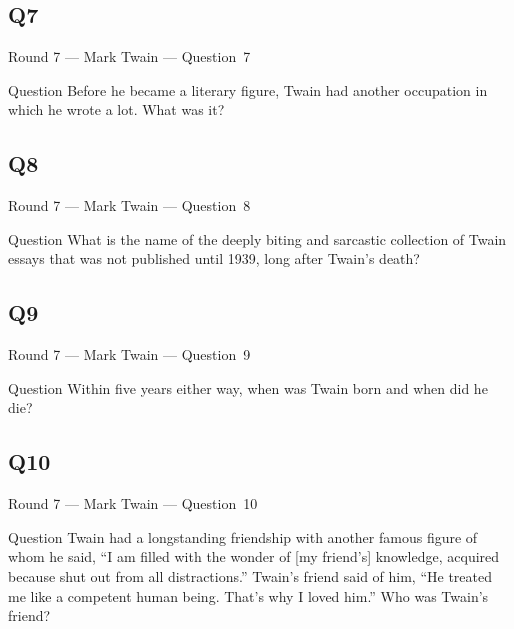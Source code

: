 \documentclass[11pt]{beamer}
\begin{document}
\subsection*{Q7}
\begin{frame}[t]{Round 7 --- Mark Twain --- \mbox{Question 7}}
\vspace{-0.5em}
\begin{block}{Question}
Before he became a literary figure, Twain had another occupation in which he wrote a lot.  What was it?
\end{block}
\end{frame}
\subsection*{Q8}
\begin{frame}[t]{Round 7 --- Mark Twain --- \mbox{Question 8}}
\vspace{-0.5em}
\begin{block}{Question}
What is the name of the deeply biting and sarcastic collection of Twain essays that was not published until 1939, long after Twain's death?
\end{block}
\end{frame}
\subsection*{Q9}
\begin{frame}[t]{Round 7 --- Mark Twain --- \mbox{Question 9}}
\vspace{-0.5em}
\begin{block}{Question}
Within five years either way, when was Twain born and when did he die?
\end{block}
\end{frame}
\subsection*{Q10}
\begin{frame}[t]{Round 7 --- Mark Twain --- \mbox{Question 10}}
\vspace{-0.5em}
\begin{block}{Question}
Twain had a longstanding friendship with another famous figure of whom he said, ``I am filled with the wonder of [my friend's] knowledge, acquired because shut out from all distractions.'' Twain's friend said of him, ``He treated me like a competent human being. That's why I loved him.''  Who was Twain's friend? 
\end{block}
\end{frame}
\end{document}
